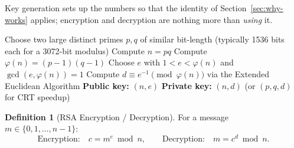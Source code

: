 \documentclass[11pt]{article}
\theoremstyle{definition}
\newtheorem{definition}[theorem]{Definition}
\theoremstyle{remark}
\begin{document}
Key generation sets up the numbers so that the identity of Section~\ref{sec:why-works} applies; encryption and decryption are nothing more than \emph{using} it.


\begin{algorithm}[h]
\caption{RSA Key Generation}\label{alg:keygen}
\begin{algorithmic}[1]
\State Choose two large distinct primes $p, q$ of similar bit-length (typically 1536 bits each for a 3072-bit modulus)
\State Compute $n = pq$
\State Compute $\varphi(n) = (p-1)(q-1)$
\State Choose $e$ with $1 < e < \varphi(n)$ and $\gcd(e, \varphi(n)) = 1$
\State Compute $d \equiv e^{-1} \pmod{\varphi(n)}$ via the Extended Euclidean Algorithm
\State \textbf{Public key:} $(n, e)$ \qquad \textbf{Private key:} $(n, d)$ \quad (or $(p,q,d)$ for CRT speedup)
\end{algorithmic}
\end{algorithm}


\begin{definition}[RSA Encryption / Decryption]
For a message $m \in \{0, 1, \dots, n-1\}$:
\[
\text{Encryption:} \quad c = m^{e} \bmod n, \qquad \text{Decryption:} \quad m = c^{d} \bmod n.
\]
\end{definition}
\end{document}

